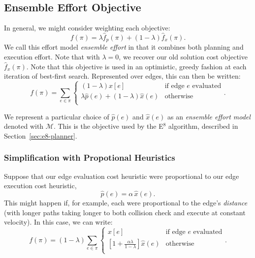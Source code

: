 \subsection{Ensemble Effort Objective}

In general, we might consider weighting each objective:
\begin{equation}
   f(\pi) = \lambda \hat{f}_p(\pi) + (1 - \lambda) \hat{f}_x(\pi) .
   \label{eqn:general-objective}
\end{equation}
We call this effort model
\emph{ensemble effort}
in that it combines both planning and execution effort.
Note that with $\lambda=0$,
we recover our old solution cost objective $\hat{f}_x(\pi)$.
Note that this objective is used in an optimistic, greedy fashion at each
iteration of best-first search.
Represented over edges,
this can then be written:
\begin{equation}
   f(\pi) = \sum_{e \in \pi} \left\{
   \begin{array}{cl}
      (1 - \lambda) x[e] & \mbox{if edge } e \mbox{ evaluated}  \\
      \lambda \hat{p}(e) + (1 - \lambda) \hat{x}(e) & \mbox{otherwise} \\
   \end{array}
   \right.
   .
   \label{eqn:general-objective-explicit}
\end{equation}

We represent a particular choice of $\hat{p}(e)$
and $\hat{x}(e)$ as an \emph{ensemble effort model}
denoted with $\mathcal{M}$.
This is the objective used by the E$^8$ algorithm,
described in Section~\ref{sec:e8-planner}.

\subsubsection*{Simplification with Propotional Heuristics}

Suppose that our edge evaluation cost heuristic
were proportional to our edge execution cost heuristic,
\begin{equation}
   \hat{p}(e) = \alpha \, \hat{x}(e) .
\end{equation}
This might happen if, for example, each were proportional to the edge's
\emph{distance} (with longer paths taking longer to both collision check
and execute at constant velocity).
In this case, we can write:
\begin{equation}
   f(\pi) = (1-\lambda) \sum_{e \in \pi} \left\{
   \begin{array}{cl}
      x[e] & \mbox{if edge } e \mbox{ evaluated}  \\
      \left[ 1 + \frac{\alpha\lambda}{1 - \lambda} \right] \hat{x}(e) & \mbox{otherwise} \\
   \end{array}
   \right.
   .
   \label{eqn:prop-heuristics}
\end{equation}

